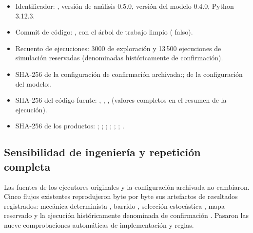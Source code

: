 \begin{itemize}
  \raggedright
  \item Identificador: \code{\RunID}, versión de análisis 0.5.0, versión del modelo 0.4.0, Python 3.12.3.
  \item Commit de código: , con el árbol de trabajo limpio ( falso).
  \item Recuento de ejecuciones: 3000 de exploración y 13\,500 ejecuciones de simulación reservadas (denominadas históricamente de confirmación).
  \item SHA-256 de la configuración de confirmación archivada:\newline{}; de la configuración del modelo:\newline{}.
  \item SHA-256 del código fuente:  ,  ,  ,   (valores completos en el resumen de la ejecución).
  \item SHA-256 de los productos:  ;  ;  ;  ;\newline{} ;\newline{} ;  .
\end{itemize}

\subsection*{Sensibilidad de ingeniería y repetición completa}

Las fuentes de los ejecutores originales y la configuración archivada no cambiaron. Cinco flujos existentes reprodujeron byte por byte sus artefactos de resultados registrados: mecánica determinista , barrido , selección estocástica , mapa reservado  y la ejecución históricamente denominada de confirmación . Pasaron las nueve comprobaciones automáticas de implementación y reglas.

